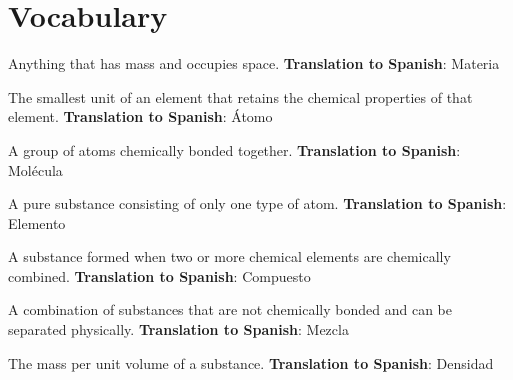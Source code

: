 \section{Vocabulary}


\begin{vocabulary}[Matter]
Anything that has mass and occupies space. \newline
\textbf{Translation to Spanish}: Materia \newline
\end{vocabulary}



\begin{vocabulary}[Atom]
The smallest unit of an element that retains the chemical properties of that element. \newline
\textbf{Translation to Spanish}: Átomo \newline
\end{vocabulary}


\begin{vocabulary}[Molecule]
A group of atoms chemically bonded together. \newline
\textbf{Translation to Spanish}: Molécula \newline
\end{vocabulary}


\begin{vocabulary}[Element]
A pure substance consisting of only one type of atom. \newline
\textbf{Translation to Spanish}: Elemento \newline
\end{vocabulary}


\begin{vocabulary}[Compound]
A substance formed when two or more chemical elements are chemically combined. \newline
\textbf{Translation to Spanish}: Compuesto \newline
\end{vocabulary}


\begin{vocabulary}[Mixture]
A combination of substances that are not chemically bonded and can be separated physically. \newline
\textbf{Translation to Spanish}: Mezcla \newline
\end{vocabulary}


\begin{vocabulary}[Density]
The mass per unit volume of a substance. \newline
\textbf{Translation to Spanish}: Densidad \newline
\end{vocabulary}



